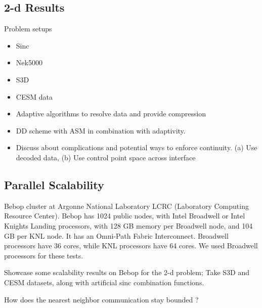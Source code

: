\subsection{2-d Results}

Problem setups
\begin{itemize}
	\item Sinc
	\item Nek5000
	\item S3D
	\item CESM data
\end{itemize}


\begin{itemize}
	\item Adaptive algorithms to resolve data and provide compression
	\item DD scheme with ASM in combination with adaptivity.
	\item Discuss about complications and potential ways to enforce continuity. (a) Use decoded data, (b) Use control point space across interface
\end{itemize}

\subsection{Parallel Scalability}\label{SCM}


Bebop cluster at
Argonne National Laboratory LCRC (Laboratory Computing
Resource Center). Bebop has 1024 public nodes, with Intel
Broadwell or Intel Knights Landing processors, with 128 GB
memory per Broadwell node, and 104 GB per KNL node. It
has an Omni-Path Fabric Interconnect. Broadwell processors
have 36 cores, while KNL processors have 64 cores. We used
Broadwell processors for these tests.


Showcase some scalability results on Bebop for the 2-d problem; Take S3D and CESM datasets, along with artificial sinc combination functions.

How does the nearest neighbor communication stay bounded ?



